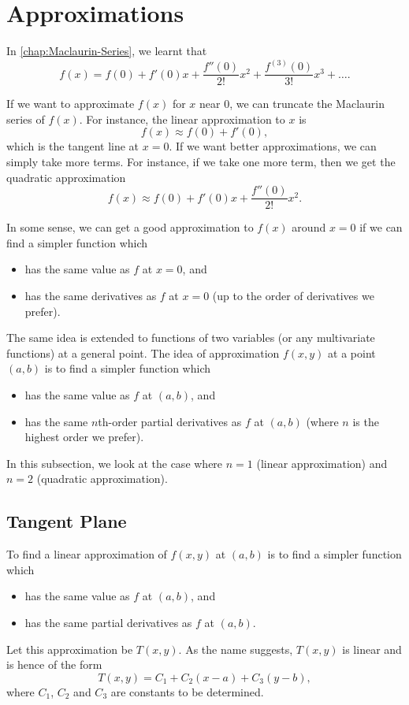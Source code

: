 \section{Approximations}

In \SS\ref{chap:Maclaurin-Series}, we learnt that \[f(x) = f(0) + f'(0) x + \frac{f''(0)}{2!} x^2 + \frac{f^{(3)}(0)}{3!} x^3 + \dots.\]

If we want to approximate $f(x)$ for $x$ near $0$, we can truncate the Maclaurin series of $f(x)$. For instance, the linear approximation to $x$ is \[f(x) \approx f(0) + f'(0),\] which is the tangent line at $x = 0$. If we want better approximations, we can simply take more terms. For instance, if we take one more term, then we get the quadratic approximation \[f(x) \approx f(0) + f'(0) x + \frac{f''(0)}{2!} x^2.\]

In some sense, we can get a good approximation to $f(x)$ around $x = 0$ if we can find a simpler function which
\begin{itemize}
    \item has the same value as $f$ at $x = 0$, and
    \item has the same derivatives as $f$ at $x = 0$ (up to the order of derivatives we prefer).
\end{itemize}

The same idea is extended to functions of two variables (or any multivariate functions) at a general point. The idea of approximation $f(x, y)$ at a point $(a, b)$ is to find a simpler function which
\begin{itemize}
    \item has the same value as $f$ at $(a, b)$, and
    \item has the same $n$th-order partial derivatives as $f$ at $(a, b)$ (where $n$ is the highest order we prefer).
\end{itemize}

In this subsection, we look at the case where $n = 1$ (linear approximation) and $n = 2$ (quadratic approximation).

\subsection{Tangent Plane}

To find a linear approximation of $f(x, y)$ at $(a, b)$ is to find a simpler function which
\begin{itemize}
    \item has the same value as $f$ at $(a, b)$, and
    \item has the same partial derivatives as $f$ at $(a, b)$.
\end{itemize}
Let this approximation be $T(x, y)$. As the name suggests, $T(x, y)$ is linear and is hence of the form \[T(x, y) = C_1 + C_2 (x-a) + C_3 (y-b),\] where $C_1$, $C_2$ and $C_3$ are constants to be determined.

